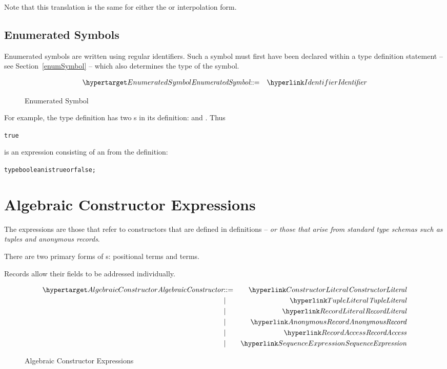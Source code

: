 \begin{aside}
Note that this translation is the same for either the \q{\$} or \q{\#} interpolation form.
\end{aside}


\subsection{Enumerated Symbols}
\label{enumeratedSymbol}
Enumerated symbols are written using regular identifiers. Such a symbol must first have been declared within a type definition statement -- see Section~\vref{enumSymbol} -- which also determines the type of the symbol.

\begin{figure}[H]
\begin{eqnarray*}
\ntDef{EnumeratedSymbol}&\arrow&\ntRef{Identifier}
\end{eqnarray*}
\caption{Enumerated Symbol}
\label{enumeratedSymbolFig}
\end{figure}

For example, the  type definition has two s in its definition:  and . Thus
\begin{alltt}
true
\end{alltt}
is an expression consisting of an  from the definition:
\begin{alltt}
type boolean is true or false;
\end{alltt}

\section{Algebraic Constructor Expressions}
\label{algebraicConstructors}

The  expressions are those that refer to constructors that are defined in  definitions -- \emph{or those that arise from standard type schemas such as tuples and anonymous records}.

There are two primary forms of s: positional  terms and  terms.

Records allow their fields to be addressed individually.

\begin{figure}[htbp]
\begin{eqnarray*}
\ntDef{AlgebraicConstructor}&\arrow&\ntRef{ConstructorLiteral}\\
&\choice&\ntRef{TupleLiteral}\\
&\choice&\ntRef{RecordLiteral}\\
&\choice&\ntRef{AnonymousRecord}\\
&\choice&\ntRef{RecordAccess}\\
&\choice&\ntRef{SequenceExpression}
\end{eqnarray*}
\caption{Algebraic Constructor Expressions}
\label{algebraicExpressionFig}
\end{figure}

